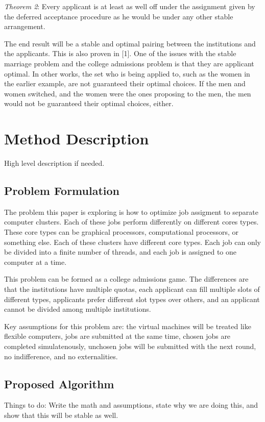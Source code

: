 \documentclass[conference]{IEEEtran}
\begin{document}
\emph{Theorem 2}:  Every applicant is at least as well off under the assignment
given by the deferred acceptance procedure as he would be under any other
stable arrangement.

The end result will be a stable and optimal pairing between
 the institutions and the applicants.  This is also proven in [1].  One 
of the issues with the stable marriage problem and the college admissions problem
is that they are applicant optimal.  In other works, the set who is being
applied to, such as the women in the earlier example, are not guaranteed
their optimal choices.  If the men and women switched, and the
women were the ones proposing to the men, the men would
not be guaranteed their optimal choices, either.

\section{Method Description}
High level description if needed.
\subsection{Problem Formulation}
The problem this paper is exploring is how to optimize job 
assigment to separate computer clusters.  Each of these
jobs perform differently on different cores types.  These
core types can be graphical processors, computational
processors, or something else.  Each of these clusters
have different core types.  Each job can only be divided into
a finite number of threads, and each job is assigned to 
one computer at a time.

This problem can be formed as a college admissions
game.  The differences are that the institutions
have multiple quotas, each applicant can fill multiple
slots of different types, applicants prefer different
slot types over others, and an applicant cannot be
divided among multiple institutions.

Key assumptions for this problem are:  the virtual machines
will be treated like flexible computers, jobs are submitted at
the same time, chosen jobs are completed simulatenously,
unchosen jobs will be submitted with the next round, no
indifference, and no externalities.

\subsection{Proposed Algorithm}
Things to do:  Write the math and assumptions, state why
we are doing this, and show that this will be stable as well.
\end{document}
